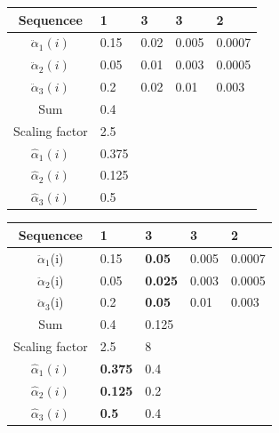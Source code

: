\begin{frame}
\begin{table}[h]
\begin{tabular}{|c|l|l|l|l|}
 \hline
Sequencee      & 1     & 3    & 3     & 2      \\ \hline
$\ddot{\alpha}_1(i)$          & 0.15  & 0.02 & 0.005 & 0.0007 \\ \hline
$\ddot{\alpha}_2(i)$          & 0.05  & 0.01 & 0.003 & 0.0005 \\ \hline
$\ddot{\alpha}_3(i)$          & 0.2   & 0.02 & 0.01  & 0.003  \\ \hline
Sum            & 0.4   &      &       &        \\ \hline
Scaling factor & 2.5   &      &       &        \\ \hline
$\hat{\alpha}_1(i)$          & 0.375 &      &       &        \\ \hline
$\hat{\alpha}_2(i)$          & 0.125 &      &       &        \\ \hline
$\hat{\alpha}_3(i)$          & 0.5   &      &       &        \\ \hline
\end{tabular}
\end{table}
\end{frame}

\begin{frame}
\begin{table}[h]
\begin{tabular}{|c|l|l|l|l|}
 \hline
Sequencee      & 1              & 3              & 3     & 2      \\ \hline
$\ddot{\alpha}_1$(i)          & 0.15           & \textbf{0.05}  & 0.005 & 0.0007 \\ \hline
$\ddot{\alpha}_2$(i)          & 0.05           & \textbf{0.025} & 0.003 & 0.0005 \\ \hline
$\ddot{\alpha}_3$(i)          & 0.2            & \textbf{0.05}  & 0.01  & 0.003  \\ \hline
Sum            & 0.4            & 0.125          &       &        \\ \hline
Scaling factor & 2.5            & 8              &       &        \\ \hline
$\hat{\alpha}_1(i)$          & \textbf{0.375} & 0.4            &       &        \\ \hline
$\hat{\alpha}_2(i)$          & \textbf{0.125} & 0.2            &       &        \\ \hline
$\hat{\alpha}_3(i)$          & \textbf{0.5}   & 0.4            &       &        \\ \hline
\end{tabular}
\end{table}
\end{frame}

